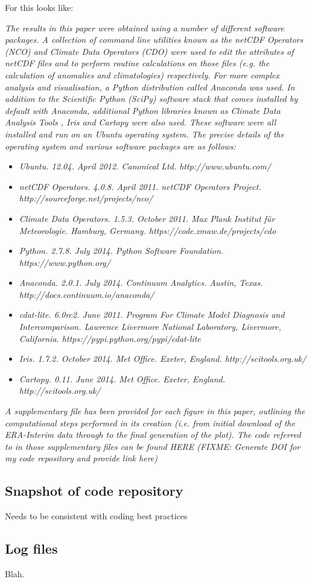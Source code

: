 For \citet{Irving2015} this looks like:

\textit{The results in this paper were obtained using a number of different software packages. A collection of command line utilities known as the netCDF Operators (NCO) and Climate Data Operators (CDO) were used to edit the attributes of netCDF files and to perform routine calculations on those files (e.g. the calculation of anomalies and climatologies) respectively. For more complex analysis and visualisation, a Python distribution called Anaconda was used. In addition to the Scientific Python (SciPy) software stack that comes installed by default with Anaconda, additional Python libraries known as Climate Data Analysis Tools \citep[CDAT;][]{Doutriaux2009}, Iris and Cartopy were also used. These software were all installed and run on an Ubuntu operating system. The precise details of the operating system and various software packages are as follows:}
\begin{itemize}
\item \textit{Ubuntu. 12.04. April 2012. Canonical Ltd. http://www.ubuntu.com/}
\item \textit{netCDF Operators. 4.0.8. April 2011. netCDF Operators Project. http://sourceforge.net/projects/nco/}
\item \textit{Climate Data Operators. 1.5.3. October 2011. Max Plank Institut f{\"u}r Meteorologie. Hamburg, Germany. https://code.zmaw.de/projects/cdo}
\item \textit{Python. 2.7.8. July 2014. Python Software Foundation. https://www.python.org/}
\item \textit{Anaconda. 2.0.1. July 2014. Continuum Analytics. Austin, Texas. http://docs.continuum.io/anaconda/}
\item \textit{cdat-lite. 6.0rc2. June 2011. Program For Climate Model Diagnosis and Intercomparison. Lawrence Livermore National Laboratory, Livermore, California. https://pypi.python.org/pypi/cdat-lite}
\item \textit{Iris. 1.7.2. October 2014. Met Office. Exeter, England. http://scitools.org.uk/}
\item \textit{Cartopy. 0.11. June 2014. Met Office. Exeter, England. http://scitools.org.uk/}
\end{itemize}

\textit{A supplementary file has been provided for each figure in this paper, outlining the computational steps performed in its creation (i.e. from initial download of the ERA-Interim data through to the final generation of the plot). The code referred to in those supplementary files can be found HERE (\textit{FIXME: Generate DOI for my code repository and provide link here})}
 

\subsection{Snapshot of code repository}

Needs to be consistent with coding best practices \citep{Wilson2014a}

\subsection{Log files}

Blah.